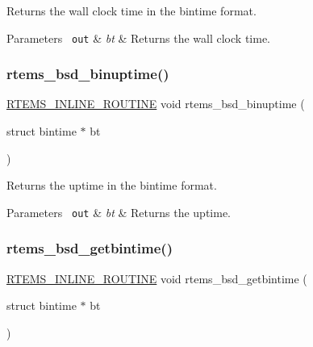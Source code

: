 Returns the wall clock time in the bintime format. 


\begin{DoxyParams}[1]{Parameters}
\mbox{\texttt{ out}}  & {\em bt} & Returns the wall clock time. \\
\hline
\end{DoxyParams}
\mbox{\label{group__RTEMSAPIBSD_ga2e0ae260b7b2b320d8e5e3cacfbb776d}} 
\subsubsection{\texorpdfstring{rtems\_bsd\_binuptime()}{rtems\_bsd\_binuptime()}}
{\footnotesize\ttfamily \mbox{\hyperlink{group__RTEMSScoreBaseDefs_gac216239df231d5dbd15e3520b0b9313f}{R\+T\+E\+M\+S\+\_\+\+I\+N\+L\+I\+N\+E\+\_\+\+R\+O\+U\+T\+I\+NE}} void rtems\+\_\+bsd\+\_\+binuptime (\begin{DoxyParamCaption}\item[{struct bintime $\ast$}]{bt }\end{DoxyParamCaption})}



Returns the uptime in the bintime format. 


\begin{DoxyParams}[1]{Parameters}
\mbox{\texttt{ out}}  & {\em bt} & Returns the uptime. \\
\hline
\end{DoxyParams}
\mbox{\label{group__RTEMSAPIBSD_ga09f1469107527aca93bf26c775b631d2}} 
\subsubsection{\texorpdfstring{rtems\_bsd\_getbintime()}{rtems\_bsd\_getbintime()}}
{\footnotesize\ttfamily \mbox{\hyperlink{group__RTEMSScoreBaseDefs_gac216239df231d5dbd15e3520b0b9313f}{R\+T\+E\+M\+S\+\_\+\+I\+N\+L\+I\+N\+E\+\_\+\+R\+O\+U\+T\+I\+NE}} void rtems\+\_\+bsd\+\_\+getbintime (\begin{DoxyParamCaption}\item[{struct bintime $\ast$}]{bt }\end{DoxyParamCaption})}



